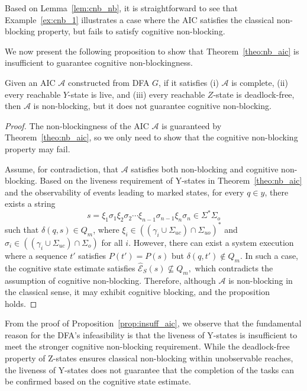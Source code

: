 \documentclass[journal,twoside,web]{ieeecolor}
\begin{document}
Based on Lemma~\ref{lem:cnb_nb}, it is straightforward to see that Example~\ref{ex:cnb_1} illustrates a case where the AIC satisfies the classical non-blocking property, but fails to satisfy cognitive non-blocking.

We now present the following proposition to show that Theorem~\ref{theo:nb_aic} is insufficient to guarantee cognitive non-blockingness.

\begin{proposition}\label{prop:insuff_aic}
Given an AIC $\mathcal{A}$ constructed from DFA $G$, if it satisfies 
    (i) $\mathcal{A}$ is complete, 
    (ii) every reachable $Y$-state is live, and 
    (iii) every reachable $Z$-state is deadlock-free,
then $\mathcal{A}$ is non-blocking, but it does not guarantee cognitive non-blocking.
\end{proposition}
%
\begin{proof}
The non-blockingness of the AIC $\mathcal{A}$ is guaranteed by Theorem~\ref{theo:nb_aic}, 
so we only need to show that the cognitive non-blocking property may fail.

Assume, for contradiction, that $\mathcal{A}$ satisfies both non-blocking and cognitive non-blocking. 
Based on the liveness requirement of Y-states in Theorem~\ref{theo:nb_aic} and the observability of events leading to marked states, 
for every $q \in y$, there exists a string
$$
    s = \xi_1 \sigma_1 \xi_2 \sigma_2 \cdots \xi_{n-1} \sigma_{n-1} \xi_n \sigma_n \in \Sigma^*\Sigma_o
$$
such that $\delta(q,s) \in Q_m$, where
$\xi_i \in ((\gamma_i \cup \Sigma_{uc}) \cap \Sigma_{uo})^*$ 
and $\sigma_i \in ((\gamma_i \cup \Sigma_{uc}) \cap \Sigma_o)$ for all $i$.
%
However, there can exist a system execution where a sequence $t'$ satisfies $P(t') = P(s)$ 
but $\delta(q,t') \notin Q_m$. In such a case, the cognitive state estimate satisfies
$
    \hat{\mathcal{E}}_S(s) \not\subseteq Q_m,
$
which contradicts the assumption of cognitive non-blocking.
%
Therefore, although $\mathcal{A}$ is non-blocking in the classical sense, it may exhibit cognitive blocking, 
and the proposition holds.
\end{proof}

From the proof of Proposition~\ref{prop:insuff_aic}, we observe that the fundamental reason for the DFA's infeasibility is that the liveness of Y-states is insufficient to meet the stronger cognitive non-blocking requirement. 
While the deadlock-free property of Z-states ensures classical non-blocking within unobservable reaches, the liveness of Y-states does not guarantee that the completion of the tasks can be confirmed based on the cognitive state estimate.
\end{document}
